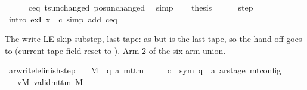 \begin{isabellebody}
\ \ \ \ \isamarkupfalse%
\ c{\isacharprime}{\kern0pt}{\isacharunderscore}{\kern0pt}eq\ ts{\isacharunderscore}{\kern0pt}unchanged\ pos{\isacharunderscore}{\kern0pt}unchanged\ \isamarkupfalse%
\ simp\isanewline
\ \ \isamarkupfalse%
\ {\isacharquery}{\kern0pt}thesis\isanewline
\ \ \ \ \isamarkupfalse%
\ step\ \isamarkupfalse%
\ {\isacharparenleft}{\kern0pt}intro\ exI{\isacharbrackleft}{\kern0pt}\ x\ {\isacharequal}{\kern0pt}\ {\isacharquery}{\kern0pt}c{\isacharprime}{\kern0pt}{\isacharprime}{\kern0pt}{\isacharbrackright}{\kern0pt}{\isacharparenright}{\kern0pt}\ {\isacharparenleft}{\kern0pt}simp\ add{\isacharcolon}{\kern0pt}\ c{\isacharprime}{\kern0pt}{\isacharunderscore}{\kern0pt}eq{\isacharparenright}{\kern0pt}\isanewline
{}\isamarkupfalse%
%
\endisatagproof
{\isafoldproof}%
%
\isadelimproof
%
\endisadelimproof
%
\begin{isamarkuptext}%
The write LE-skip substep, last tape: as 
  but  is the last tape, so the hand-off goes to
   (current-tape field reset to ).
  Arm 2 of the six-arm  union.%
\end{isamarkuptext}\isamarkuptrue%
\isamarkupfalse%
\ ar{\isacharunderscore}{\kern0pt}write{\isacharunderscore}{\kern0pt}le{\isacharunderscore}{\kern0pt}finish{\isacharunderscore}{\kern0pt}step{\isacharcolon}{\kern0pt}\isanewline
\ \ \ M\ {\isacharcolon}{\kern0pt}{\isacharcolon}{\kern0pt}\ {\isachardoublequoteopen}{\isacharparenleft}{\kern0pt}{\isacharprime}{\kern0pt}q{\isacharcomma}{\kern0pt}\ {\isacharprime}{\kern0pt}a{\isacharparenright}{\kern0pt}\ mttm{\isachardoublequoteclose}\isanewline
\ \ \ \ \ c{\isacharprime}{\kern0pt}\ {\isacharcolon}{\kern0pt}{\isacharcolon}{\kern0pt}\ {\isachardoublequoteopen}{\isacharparenleft}{\kern0pt}sym{}{\isacharcomma}{\kern0pt}\ {\isacharprime}{\kern0pt}q\ {\isasymtimes}\ {\isacharprime}{\kern0pt}a\ ar{\isacharunderscore}{\kern0pt}stage{\isacharparenright}{\kern0pt}\ mt{\isacharunderscore}{\kern0pt}config{\isachardoublequoteclose}\isanewline
\ \ \ vM{\isacharcolon}{\kern0pt}\ {\isachardoublequoteopen}valid{\isacharunderscore}{\kern0pt}mttm\ M{\isachardoublequoteclose}\isanewline

\end{isabellebody}
